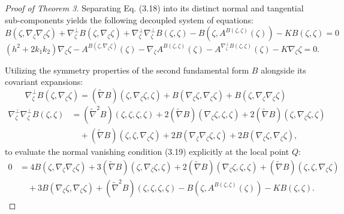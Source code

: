\documentclass[10pt,a4paper]{amsart}
\begin{document}
\begin{proof}[Proof of Theorem 3]
Separating Eq. (3.18) into its distinct normal and tangential sub-components yields the following decoupled system of equations:
\begin{equation}
B(\zeta,\nabla_\zeta \nabla_\zeta \zeta)+\nabla_\zeta^\perp B(\zeta,\nabla_\zeta \zeta)+\nabla_\zeta^\perp \nabla_\zeta^\perp B(\zeta,\zeta)-B(\zeta,A^{B(\zeta,\zeta)}(\zeta))-KB(\zeta,\zeta)=0
\end{equation}
\begin{equation}
(h^2+2k_1 k_2)\nabla_\zeta \zeta-A^{B(\zeta,\nabla_\zeta \zeta)}(\zeta)-\nabla_\zeta A^{B(\zeta,\zeta)}(\zeta)-A^{\nabla_\zeta^\perp B(\zeta,\zeta)}(\zeta)-K\nabla_\zeta \zeta=0.
\end{equation}

Utilizing the symmetry properties of the second fundamental form $B$ alongside its covariant expansions:
\begin{equation}
\nabla_\zeta^\perp B(\zeta,\nabla_\zeta \zeta)=(\tilde{\nabla} B)(\zeta,\nabla_\zeta \zeta,\zeta)+B(\nabla_\zeta \zeta,\nabla_\zeta \zeta)+B(\zeta,\nabla_\zeta \nabla_\zeta \zeta)
\end{equation}
\begin{equation}
\begin{aligned}
\nabla_\zeta^\perp \nabla_\zeta^\perp B(\zeta,\zeta) &= (\tilde{\nabla}^2 B)(\zeta,\zeta,\zeta,\zeta)+2(\tilde{\nabla} B)(\nabla_\zeta \zeta,\zeta,\zeta)+2(\tilde{\nabla} B)(\zeta,\nabla_\zeta \zeta,\zeta) \\
&\quad +(\tilde{\nabla} B)(\zeta,\zeta,\nabla_\zeta \zeta)+2B(\nabla_\zeta \nabla_\zeta \zeta,\zeta)+2B(\nabla_\zeta \zeta,\nabla_\zeta \zeta),
\end{aligned}
\end{equation}
to evaluate the normal vanishing condition (3.19) explicitly at the local point $Q$:
\begin{equation}
\begin{aligned}
0 &= 4B(\zeta,\nabla_\zeta \nabla_\zeta \zeta)+3(\tilde{\nabla} B)(\zeta,\nabla_\zeta \zeta,\zeta)+2(\tilde{\nabla} B)(\nabla_\zeta \zeta,\zeta,\zeta)+(\tilde{\nabla} B)(\zeta,\zeta,\nabla_\zeta \zeta) \\
&\quad +3B(\nabla_\zeta \zeta,\nabla_\zeta \zeta)+(\tilde{\nabla}^2 B)(\zeta,\zeta,\zeta,\zeta)-B(\zeta,A^{B(\zeta,\zeta)}(\zeta))-KB(\zeta,\zeta).
\end{aligned}
\end{equation}


\end{proof}
\end{document}
